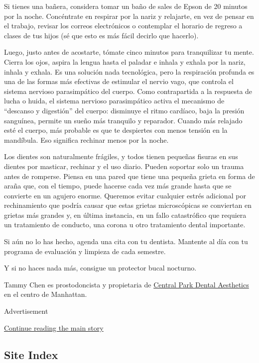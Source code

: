 Si tienes una bañera, considera tomar un baño de sales de Epson de 20
minutos por la noche. Concéntrate en respirar por la nariz y relajarte,
en vez de pensar en el trabajo, revisar los correos electrónicos o
contemplar el horario de regreso a clases de tus hijos (sé que esto es
más fácil decirlo que hacerlo).

Luego, justo antes de acostarte, tómate cinco minutos para tranquilizar
tu mente. Cierra los ojos, aspira la lengua hasta el paladar e inhala y
exhala por la nariz, inhala y exhala. Es una solución nada tecnológica,
pero la respiración profunda es una de las formas más efectivas de
estimular el nervio vago, que controla el sistema nervioso parasimpático
del cuerpo. Como contrapartida a la respuesta de lucha o huida, el
sistema nervioso parasimpático activa el mecanismo de ``descanso y
digestión'' del cuerpo: disminuye el ritmo cardíaco, baja la presión
sanguínea, permite un sueño más tranquilo y reparador. Cuando más
relajado esté el cuerpo, más probable es que te despiertes con menos
tensión en la mandíbula. Eso significa rechinar menos por la noche.

Los dientes son naturalmente frágiles, y todos tienen pequeñas fisuras
en sus dientes por masticar, rechinar y el uso diario. Pueden soportar
solo un trauma antes de romperse. Piensa en una pared que tiene una
pequeña grieta en forma de araña que, con el tiempo, puede hacerse cada
vez más grande hasta que se convierte en un agujero enorme. Queremos
evitar cualquier estrés adicional por rechinamiento que podría causar
que estas grietas microscópicas se conviertan en grietas más grandes y,
en última instancia, en un fallo catastrófico que requiera un
tratamiento de conducto, una corona u otro tratamiento dental
importante.

Si aún no lo has hecho, agenda una cita con tu dentista. Mantente al día
con tu programa de evaluación y limpieza de cada semestre.

Y si no haces nada más, consigue un protector bucal nocturno.

Tammy Chen es prostodoncista y propietaria de
\href{https://www.cpdanyc.com/}{Central Park Dental Aesthetics} en el
centro de Manhattan.

Advertisement

\protect\hyperlink{after-bottom}{Continue reading the main story}

\hypertarget{site-index}{%
\subsection{Site Index}\label{site-index}}

